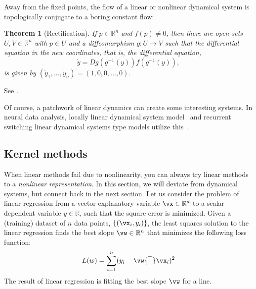 \documentclass[a4paper,11pt]{exam}
\newtheorem{theorem}{Theorem}
\newcounter{ct}
\newcommand{\inv}{^{-1}}
\newcommand{\trp}{{^\top}} %
\newcommand{\field}[1]{\ensuremath{\mathbb{#1}}}
\newcommand{\reals}{\field{R}}
\begin{document}
\begin{questions}
Away from the fixed points, the flow of a linear or nonlinear dynamical system is topologically conjugate to a boring constant flow:
\begin{theorem}[Rectification]
    If $p \in \reals^n$ and $f(p) \neq 0$, then there are open sets $U, V \in \reals^n$ with $p \in U$ and a diffeomorphism $g: U \to V$ such that the differential equation in the new coordinates, that is, the differential equation,
    $$ \dot{y} = Dg(g\inv(y)) f(g\inv(y)), $$
is given by $(\dot{y}_1, \ldots, \dot{y}_n) = (1, 0, 0, \ldots, 0)$.
\end{theorem}
See \citet[Lemma 1.120]{Chicone2006}.

Of course, a patchwork of linear dynamics can create some interesting systems.
In neural data analysis, locally linear dynamical system model~\cite{Zhao2016d} and recurrent switching linear dynamical systems type models utilize this~\citep{Linderman2017,Nassar2018b}.

\subsection{Kernel methods}
When linear methods fail due to nonlinearity, you can always try linear methods to a \emph{nonlinear representation}.
In this section, we will deviate from dynamical systems, but connect back in the next section.
Let us consider the problem of linear regression from a vector explanatory variable $\vx \in \reals^d$ to a scalar dependent variable $y \in \reals$, such that the square error is minimized.
Given a (training) dataset of $n$ data points, $\{ (\vx_i, y_i) \}$, the least squares solution to the linear regression finds the best slope $\vw \in \reals^n$ that minimizes the following loss function:
\begin{align}\label{eq:leastsquares:linear}
    L(w) = \sum_{i=1}^n (y_i - \vw\trp \vx_i)^2
\end{align}
The result of linear regression is fitting the best slope $\vw$ for a line.


\end{questions}
\end{document}
